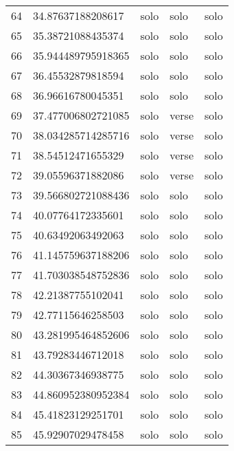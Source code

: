 \begin{table}[]
\begin{tabular}{lllll}
    64   & 34.87637188208617  & solo         & solo            & solo           \\
    65   & 35.38721088435374  & solo         & solo            & solo           \\
    66   & 35.944489795918365 & solo         & solo            & solo           \\
    67   & 36.45532879818594  & solo         & solo            & solo           \\
    68   & 36.96616780045351  & solo         & solo            & solo           \\
    69   & 37.477006802721085 & solo         & verse           & solo           \\
    70   & 38.034285714285716 & solo         & verse           & solo           \\
    71   & 38.54512471655329  & solo         & verse           & solo           \\
    72   & 39.05596371882086  & solo         & verse           & solo           \\
    73   & 39.566802721088436 & solo         & solo            & solo           \\
    74   & 40.07764172335601  & solo         & solo            & solo           \\
    75   & 40.63492063492063  & solo         & solo            & solo           \\
    76   & 41.145759637188206 & solo         & solo            & solo           \\
    77   & 41.703038548752836 & solo         & solo            & solo           \\
    78   & 42.21387755102041  & solo         & solo            & solo           \\
    79   & 42.77115646258503  & solo         & solo            & solo           \\
    80   & 43.281995464852606 & solo         & solo            & solo           \\
    81   & 43.79283446712018  & solo         & solo            & solo           \\
    82   & 44.30367346938775  & solo         & solo            & solo           \\
    83   & 44.860952380952384 & solo         & solo            & solo           \\
    84   & 45.41823129251701  & solo         & solo            & solo           \\
    85   & 45.92907029478458  & solo         & solo            & solo           \\

\end{tabular}
\end{table}
